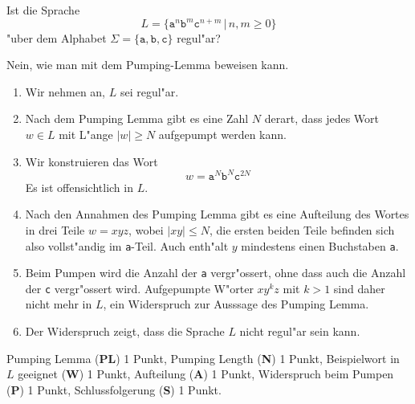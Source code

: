 Ist die Sprache
\[
L=\{ \texttt{a}^n\texttt{b}^m\texttt{c}^{n+m}\,|\,n,m\ge 0\}
\]
"uber dem Alphabet $\Sigma= \{\texttt{a},\texttt{b},\texttt{c}\}$
regul"ar?

\begin{loesung}
Nein, wie man mit dem Pumping-Lemma beweisen kann.
\begin{enumerate}
\item
Wir nehmen an, $L$ sei regul"ar.
\item
Nach dem Pumping Lemma gibt es eine Zahl $N$ derart, dass jedes
Wort $w\in L$ mit L"ange $|w|\ge N$ aufgepumpt werden kann.
\item
Wir konstruieren das Wort
\[
w=\texttt{a}^N\texttt{b}^N\texttt{c}^{2N}
\]
Es ist offensichtlich in $L$.
\item
Nach den Annahmen des Pumping Lemma gibt es eine Aufteilung des
Wortes in drei Teile $w=xyz$, wobei $|xy|\le N$, die ersten beiden
Teile befinden sich also vollst"andig im \texttt{a}-Teil.
Auch enth"alt $y$ mindestens einen Buchstaben \texttt{a}.
\item
Beim Pumpen wird die Anzahl der \texttt{a} vergr"ossert, ohne dass auch
die Anzahl der \texttt{c} vergr"ossert wird.
Aufgepumpte W"orter $xy^kz$ mit $k>1$ sind daher nicht mehr in $L$,
ein Widerspruch zur Ausssage des Pumping Lemma.
\item 
Der Widerspruch zeigt, dass die Sprache $L$ nicht regul"ar sein kann.
\qedhere
\end{enumerate}
\end{loesung}

\begin{bewertung}
Pumping Lemma ({\bf PL}) 1 Punkt,
Pumping Length ({\bf N}) 1 Punkt,
Beispielwort in $L$ geeignet ({\bf W}) 1 Punkt,
Aufteilung ({\bf A}) 1 Punkt,
Widerspruch beim Pumpen ({\bf P}) 1 Punkt,
Schlussfolgerung ({\bf S}) 1 Punkt.
\end{bewertung}

